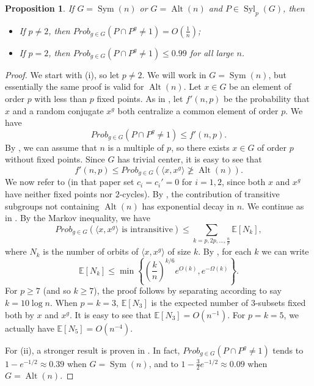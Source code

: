 \documentclass[11pt]{amsart}
\numberwithin{equation}{section}
\newtheorem{proposition}[theorem]{Proposition}
\theoremstyle{definition}
\theoremstyle{remark}
\newcommand{\Sym}{\mathop{\mathrm{Sym}}}
\newcommand{\Alt}{\mathop{\mathrm{Alt}}}
\newcommand{\Syl}{\mathop{\mathrm{Syl}}}
\begin{document}
\begin{proposition} \label{propSym}
If $G=\Sym(n)$ or $G=\Alt(n)$ and $P \in \Syl_p(G)$, then
\begin{itemize}
\item[(i)] If $p \neq 2$, then $Prob_{g \in G}(P \cap P^g \neq 1) = O \left( \frac{1}{n} \right)$;
\item[(ii)] If $p=2$, then $Prob_{g \in G}(P \cap P^g \neq 1) \leq 0.99$ for all large $n$.
\end{itemize}
\end{proposition}
\begin{proof}
We start with (i), so let $p \neq 2$.
We will work in $G=\Sym(n)$, but essentially the same proof is valid for $\Alt(n)$.
Let $x \in G$ be an element of order $p$ with less than $p$ fixed points.
As in \cite[Sec. 4]{DGG+25}, let $f'(n,p)$ be the probability that $x$ and a random conjugate $x^g$
both centralize a common element of order $p$.
We have
$$ Prob_{g \in G}(P \cap P^g \neq 1) \leq f'(n,p) . $$
By \cite[Lem. 4.7]{DGG+25}, we can assume that $n$ is a multiple of $p$,
so there exists $x \in G$ of order $p$ without fixed points.
Since $G$ has trivial center, it is easy to see that
$$ f'(n,p) \leq Prob_{g \in G}(\langle x,x^g \rangle \ngeqslant \Alt(n)) . $$
We now refer to \cite[Sec. 3-4]{EG21}
(in that paper set $c_i=c_i'=0$ for $i=1,2$, since both $x$ and $x^g$ have neither fixed points nor $2$-cycles).
By \cite[Sec. 4]{EG21}, the contribution of transitive subgroups not containing $\Alt(n)$ has exponential decay in $n$.
We continue as in \cite[Sec. 3]{EG21}.
By the Markov inequality, we have
$$ Prob_{g \in G}(\langle x,x^g \rangle \mbox{ is intransitive} ) \leq
\sum_{k = p,2p,\ldots,\tfrac{n}{p}} \mathbb{E}[N_k] , $$
where $N_k$ is the number of orbits of $\langle x,x^g \rangle$ of size $k$.
By \cite[Lem. 3.2-3.3]{EG21}, for each $k$ we can write
$$ \mathbb{E}[N_k] \leq \min \left\{ \left( \frac{k}{n} \right)^{k/6} e^{O(k)} , e^{-\Omega(k)} \right\} . $$
For $p \geq 7$ (and so $k \geq 7$), the proof follows by separating according to say $k=10 \log n$.
When $p=k=3$, $\mathbb{E}[N_3]$ is the expected number of $3$-subsets fixed both by $x$ and $x^g$.
It is easy to see that $\mathbb{E}[N_3] = O(n^{-1})$.
For $p=k=5$, we actually have $\mathbb{E}[N_5] = O(n^{-4})$.

For (ii), a stronger result is proven in \cite{Ebe25}.
In fact, $Prob_{g \in G}(P \cap P^g \neq 1)$ tends to $1-e^{-1/2} \approx 0.39$ when $G=\Sym(n)$,
and to $1-\tfrac{3}{2} e^{-1/2} \approx 0.09$ when $G=\Alt(n)$.
\end{proof}
\end{document}
